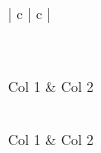 \documentclass[12pt]{article}
\begin{document}
\listoftables
\begin{longtable}[c]{| c | c |}
 \caption{Nombre de la tabla.\label{etiqueta}}\\
 \hline
 \\
 \hline
 Col 1 & Col 2\\
 \hline
 \endfirsthead %
 
 \hline
 \\
 \hline
  Col 1 & Col 2\\
 \hline
 \endhead %
 
 \hline
 \endfoot %
  
 \hline
 \\
 \hline\hline
 \endlastfoot %
 

\end{longtable}
\end{document}
